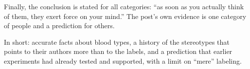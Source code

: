 \begin{afterword}
Finally, the conclusion is stated for all categories: ``as soon as you actually think of them, they exert force on your mind.'' The post's own evidence is one category of people and a prediction for others.

In short: accurate facts about blood types, a history of the stereotypes that points to their authors more than to the labels, and a prediction that earlier experiments had already tested and supported, with a limit on ``mere'' labeling.
\end{afterword}
